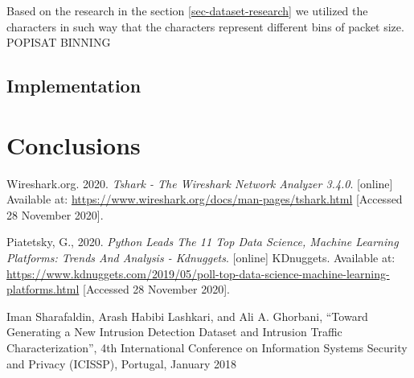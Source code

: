 \documentclass{article}
\begin{document}
Based on the research in the section \ref{sec-dataset-research} we utilized the characters in such way that the characters represent different bins of packet size. POPISAT BINNING

\subsection{Implementation}

\section{Conclusions}






\begin{thebibliography}{}

 Wireshark.org. 2020. \textit{Tshark - The Wireshark Network Analyzer 3.4.0}. [online] Available at: \url{https://www.wireshark.org/docs/man-pages/tshark.html} [Accessed 28 November 2020].

 Piatetsky, G., 2020. \textit{Python Leads The 11 Top Data Science, Machine Learning Platforms: Trends And Analysis - Kdnuggets}. [online] KDnuggets. Available at: \url{https://www.kdnuggets.com/2019/05/poll-top-data-science-machine-learning-platforms.html} [Accessed 28 November 2020].

 Iman Sharafaldin, Arash Habibi Lashkari, and Ali A. Ghorbani, “Toward Generating a New Intrusion Detection Dataset and Intrusion Traffic Characterization”, 4th International Conference on Information Systems Security and Privacy (ICISSP), Portugal, January 2018

\end{thebibliography}
\end{document}
